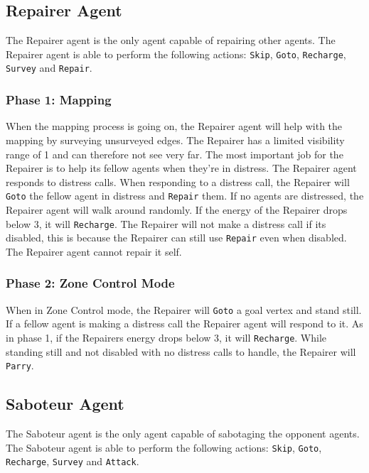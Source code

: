 \documentclass[11pt]{article}
\begin{document}
\subsection{Repairer Agent}
The Repairer agent is the only agent capable of repairing other agents. The Repairer agent is able to perform the following actions: {\tt Skip}, {\tt Goto}, {\tt Recharge}, {\tt Survey} and {\tt Repair}.

\subsubsection*{Phase 1: Mapping}
When the mapping process is going on, the Repairer agent will help with the mapping by surveying unsurveyed edges. The Repairer has a limited visibility range of 1 and can therefore not see very far. The most important job for the Repairer is to help its fellow agents when they're in distress. The Repairer agent responds to distress calls. When responding to a distress call, the Repairer will {\tt Goto} the fellow agent in distress and {\tt Repair} them. If no agents are distressed, the Repairer agent will walk around randomly. If the energy of the Repairer drops below 3, it will {\tt Recharge}. The Repairer will not make a distress call if its disabled, this is because the Repairer can still use {\tt Repair} even when disabled. The Repairer agent cannot repair it self.

\subsubsection*{Phase 2: Zone Control Mode}
When in Zone Control mode, the Repairer will {\tt Goto} a goal vertex and stand still. If a fellow agent is making a distress call the Repairer agent will respond to it. As in phase 1, if the Repairers energy drops below 3, it will {\tt Recharge}. While standing still and not disabled with no distress calls to handle, the Repairer will {\tt Parry}.

\subsection{Saboteur Agent}
The Saboteur agent is the only agent capable of sabotaging the opponent agents. The Saboteur agent is able to perform the following actions: {\tt Skip}, {\tt Goto}, {\tt Recharge}, {\tt Survey} and {\tt Attack}.
\end{document}
